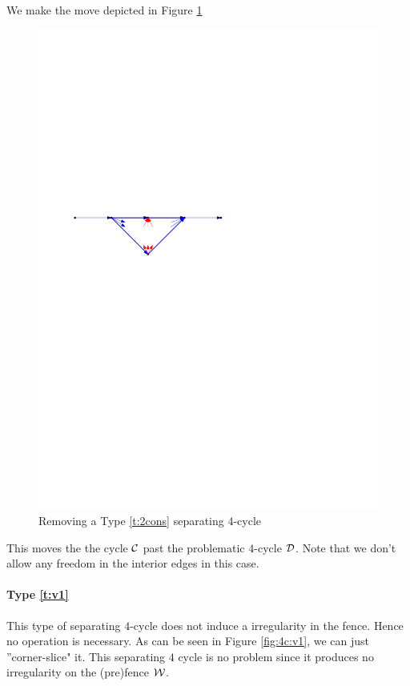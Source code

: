   We make the move depicted in Figure \ref{fig:4c:cycle_b}
  \begin{figure}[h]
    \centering
    \includegraphics[scale=1]{4cycles/img/cycle_b}
    \caption{Removing a Type \ref{t:2cons} separating $4$-cycle}
    \label{fig:4c:cycle_b}
  \end{figure}

  This moves the the cycle $\mathcal{C}$ past the problematic $4$-cycle $\mathcal{D}$. Note that we don't allow any freedom in the interior edges in this case.

  \paragraph{Type \ref{t:v1}}
  This type of separating $4$-cycle does not induce a irregularity in the fence. Hence no operation is necessary.
  As can be seen in Figure \ref{fig:4c:v1}, we can just ''corner-slice" it. This separating $4$ cycle is no problem since it produces no irregularity on the (pre)fence $\mathcal{W}$.

